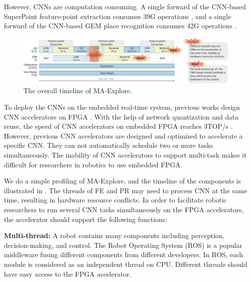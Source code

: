 However, CNNs are computation consuming. A single forward of the CNN-based SuperPoint \cite{detone2018superpoint} feature-point extraction consumes 39G operations \cite{detone2018superpoint}, and a single forward of the CNN-based GEM \cite{radenovic2018fine} place recognition consumes 42G operations \cite{radenovic2018fine}.


\begin{figure}[t]
    \centering
	\includegraphics[width=0.99\textwidth]{fig/overalltime.eps} 	
    \caption{
    The overall timeline of MA-Explore.
    }
	\label{fig:overalltime}
\end{figure}


To deploy the CNNs on the embedded real-time system, previous works design CNN accelerators on FPGA \cite{yu2018instruction,li_high_2016,qiu2016going,lu_evaluating_2017}. With the help of network quantization and data reuse, the speed of CNN accelerators on embedded FPGA reaches 3TOP/s \cite{lu_evaluating_2017}.
However, previous CNN accelerators are designed and optimized to accelerate a specific CNN. They can not automatically schedule two or more tasks simultaneously. 
The inability of CNN accelerators to support multi-task makes it difficult for researchers in robotics to use embedded FPGA.


We do a simple profiling of MA-Explore, and the timeline of the components is  illustrated in . 
The threads of FE and PR may need to process CNN at the same time, resulting in hardware resource conflicts. 
In order to facilitate robotic researchers to run several CNN tasks simultaneously on the FPGA accelerators, the accelerator should support the following functions:

\textbf{Multi-thread:} A robot contains many components including perception, decision-making, and control. 
The Robot Operating System (ROS) \cite{quigley2009ros} is a popular middleware fusing different components from different developers. 
In ROS, each module is considered as an independent thread on CPU. 
Different threads should have easy access to the FPGA accelerator.

